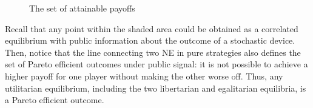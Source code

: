 \documentclass[]{article}
\begin{document}
\begin{enumerate}[label = \roman*)]
\begin{figure}[h]
		\caption{The set of attainable payoffs}
		\label{fig:setattpayoff}
	\end{figure}

	Recall that any point within the shaded area could be obtained as a correlated equilibrium with public information about the outcome of a stochastic device. Then, notice that the line connecting two NE in pure strategies also defines the set of Pareto efficient outcomes under public signal: it is not possible to achieve a higher payoff for one player without making the other worse off. Thus, any utilitarian equilibrium, including the two libertarian and egalitarian equilibria, is a Pareto efficient outcome. 
\end{enumerate}
\end{document}
